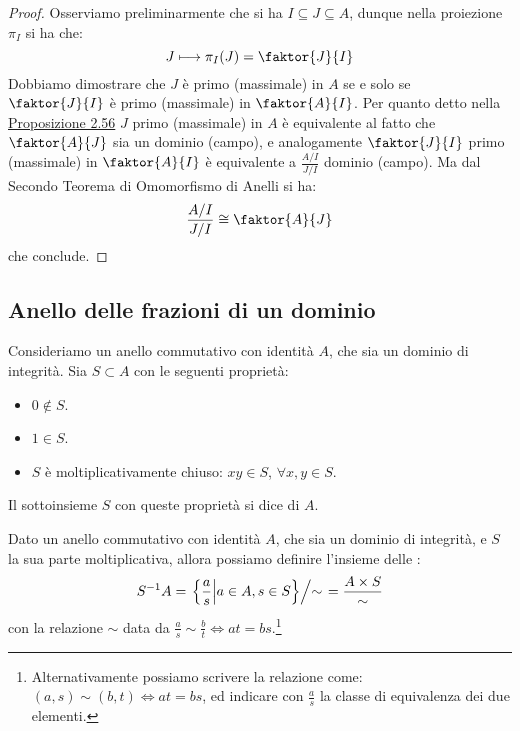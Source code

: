 \documentclass[11pt]{scrartcl}
\begin{document}
\begin{proof}
    Osserviamo preliminarmente che si ha $I \subseteq J \subseteq A$, dunque nella proiezione $\pi_I$ si ha che:
        \[ J \longmapsto \pi_I(J) = \faktor{J}{I}
            \]
    Dobbiamo dimostrare che $J$ è primo (massimale) in $A$ se e solo se $\faktor{J}{I}$ è primo (massimale) in $\faktor{A}{I}$. 
    Per quanto detto nella \hyperref[2.56]{Proposizione 2.56} $J$ primo (massimale) in $A$ è equivalente al fatto che $\faktor{A}{J}$ sia un dominio (campo), e analogamente $\faktor{J}{I}$ primo (massimale) in $\faktor{A}{I}$ è equivalente a $\displaystyle\frac{A/I}{J/I}$ dominio (campo). 
    Ma dal Secondo Teorema di Omomorfismo di Anelli si ha:
    \[ \frac{A/I}{J/I} \cong \faktor{A}{J}
        \]
    che conclude.
\end{proof}

\newpage
\subsection{Anello delle frazioni di un dominio}

\begin{definition}
    Consideriamo un anello commutativo con identità $A$, che sia un dominio di integrità. Sia $S \subset A$ con le seguenti proprietà:
    \begin{itemize}
        \item $0 \not\in S$.
        \item $1 \in S$.
        \item $S$ è moltiplicativamente chiuso: $xy \in S$, $\forall x,y \in S$.
    \end{itemize}
    Il sottoinsieme $S$ con queste proprietà si dice  di $A$.
\end{definition}

\begin{definition}
    Dato un anello commutativo con identità $A$, che sia un dominio di integrità, e $S$ la sua parte moltiplicativa, allora possiamo definire l'insieme delle :
    \[ S^{-1}A = \left.\left\{\frac{a}{s} \middle| a\in A, s \in S\right\} \middle/ \sim \right. = \frac{A \times S}{\sim}
        \]
    con la relazione $\sim$ data da $\displaystyle\frac{a}{s} \sim \frac{b}{t} \iff at = bs$.\footnote{Alternativamente possiamo scrivere la relazione come: $(a,s) \sim (b,t) \iff at = bs$, ed indicare con $\displaystyle\frac{a}{s}$ la classe di equivalenza dei due elementi.}
\end{definition}
\end{document}
